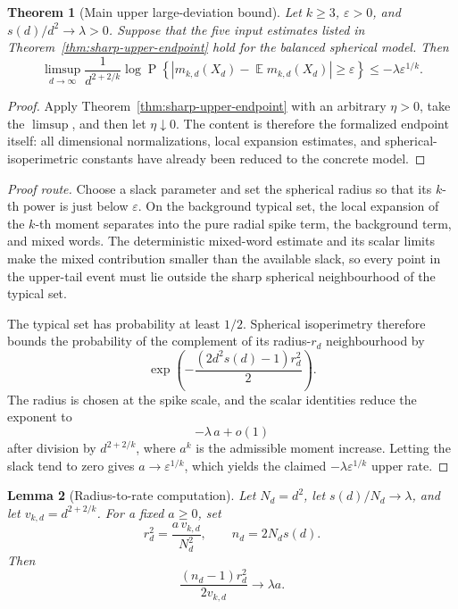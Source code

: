 \documentclass[11pt,reqno]{amsart}
\newtheorem{theorem}{Theorem}[section]
\newtheorem{lemma}[theorem]{Lemma}
\DeclareMathOperator{\E}{\mathbb{E}}
\DeclareMathOperator{\Prob}{P}
\newenvironment{revnewmath}{\begingroup\color{RevisionNewMath}}{\endgroup}
\begin{document}
\begin{revnewmath}
\begin{theorem}[Main upper large-deviation bound]
\label{thm:main-upper-large-deviation}
Let \(k\ge3\), \(\varepsilon>0\), and \(s(d)/d^2\to\lambda>0\).  Suppose that
the five input estimates listed in Theorem~\ref{thm:sharp-upper-endpoint}
hold for the balanced spherical model.  Then
\[
  \limsup_{d\to\infty}
  \frac{1}{d^{2+2/k}}
  \log
  \Prob\left\{
    \left|
      m_{k,d}(X_d)-\E m_{k,d}(X_d)
    \right|\ge \varepsilon
  \right\}
  \le
  -\lambda\varepsilon^{1/k}.
\]
\end{theorem}

\begin{proof}
Apply Theorem~\ref{thm:sharp-upper-endpoint} with an arbitrary
\(\eta>0\), take the \(\limsup\), and then let \(\eta\downarrow0\).  The
content is therefore the formalized endpoint itself: all dimensional
normalizations, local expansion estimates, and spherical-isoperimetric
constants have already been reduced to the concrete model.
\end{proof}

\begin{proof}[Proof route]
Choose a slack parameter and set the spherical radius so that its \(k\)-th
power is just below \(\varepsilon\).  On the background typical set, the local
expansion of the \(k\)-th moment separates into the pure radial spike term,
the background term, and mixed words.  The deterministic mixed-word estimate
and its scalar limits make the mixed contribution smaller than the available
slack, so every point in the upper-tail event must lie outside the sharp
spherical neighbourhood of the typical set.

The typical set has probability at least \(1/2\).  Spherical isoperimetry
therefore bounds the probability of the complement of its radius-\(r_d\)
neighbourhood by
\[
  \exp\left(-\frac{(2d^2s(d)-1)r_d^2}{2}\right).
\]
The radius is chosen at the spike scale, and the scalar identities reduce the
exponent to
\[
  -\lambda\,a + o(1)
\]
after division by \(d^{2+2/k}\), where \(a^k\) is the admissible moment
increase.  Letting the slack tend to zero gives \(a\to\varepsilon^{1/k}\),
which yields the claimed \(-\lambda\varepsilon^{1/k}\) upper rate.
\end{proof}

\begin{lemma}[Radius-to-rate computation]
\label{lem:radius-to-rate}
Let \(N_d=d^2\), let \(s(d)/N_d\to\lambda\), and let
\(v_{k,d}=d^{2+2/k}\).  For a fixed \(a\ge0\), set
\[
  r_d^2=\frac{a\,v_{k,d}}{N_d^2},
  \qquad
  n_d=2N_ds(d).
\]
Then
\[
  \frac{(n_d-1)r_d^2}{2v_{k,d}}\longrightarrow \lambda a .
\]
\end{lemma}


\end{revnewmath}
\end{document}
